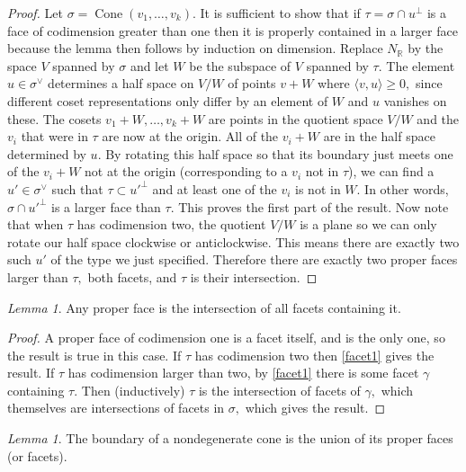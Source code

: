 \documentclass[BSc]{usydthesis}
\numberwithin{equation}{chapter}
\theoremstyle{remark}
\newtheorem{Lemma}[equation]{Lemma}
\newcommand{\R}{\mathbb{R}}
\newcommand{\V}{\vee}
\DeclareMathOperator{\Cone}{Cone}
\begin{document}
\begin{proof}
Let $\sigma = \Cone(v_1,\ldots, v_k).$ It is sufficient to show that if $\tau = \sigma \cap u^{\perp}$ is a face of codimension greater than one then it is properly contained in a larger face because the lemma then follows by induction on dimension. Replace $N_{\R}$ by the space $V$ spanned by $\sigma$ and let $W$ be the subspace of $V$ spanned by $\tau.$ The element $u\in \sigma^{\V}$ determines a half space on $V/W$ of points $v+W$ where $\langle v,u \rangle \geq 0,$ since different coset representations only differ by an element of $W$ and $u$ vanishes on these. The cosets $v_1+W, \ldots, v_k+W$ are points in the quotient space $V/W$ and the $v_i$ that were in $\tau$ are now at the origin. All of the $v_i+W$ are in the half space determined by $u.$ By rotating this half space so that its boundary just meets one of the $v_i+W$ not at the origin (corresponding to a $v_i$ not in $\tau$), we can find a $u'\in \sigma^{\V}$ such that $\tau \subset u'^{\perp}$ and at least one of the $v_i$ is not in $W.$ In other words, $\sigma \cap u'^{\perp}$ is a larger face than $\tau.$ This proves the first part of the result. Now note that when $\tau$ has codimension two, the quotient $V/W$ is a plane so we can only rotate our half space clockwise or anticlockwise. This means there are exactly two such $u'$ of the type we just specified. Therefore there are exactly two proper faces larger than $\tau,$ both facets, and $\tau$ is their intersection. 
\end{proof}

\begin{Lemma} Any proper face is the intersection of all facets containing it. 
\end{Lemma}

\begin{proof}
A proper face of codimension one is a facet itself, and is the only one, so the result is true in this case. If $\tau$ has codimension two then \ref{facet1} gives the result. If $\tau$ has codimension larger than two, by \ref{facet1} there is some facet $\gamma$ containing $\tau.$ Then (inductively) $\tau$ is the intersection of facets of $\gamma,$ which themselves are intersections of facets in $\sigma,$ which gives the result.
\end{proof}


\begin{Lemma}\label{Cone1} The boundary of a  nondegenerate cone is the union of its proper faces (or facets).
\end{Lemma}
\end{document}

